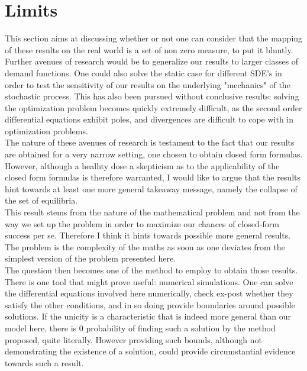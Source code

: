 \section{Limits}\label{limits}

This section aims at discussing whether or not one can consider that the mapping of these results on the real world is a set of non zero measure, to put it bluntly.\\

Further avenues of research would be to generalize our results to larger classes of demand functions. One could also solve the static case for different SDE's in order to test the sensitivity of our results on the underlying "mechanics" of the stochastic process. This has also been pursued without conclusive results: solving the optimization problem becomes quickly extremely difficult, as the second order differential equations exhibit poles, and divergences are difficult to cope with in optimization problems. \\

The nature of these avenues of research is testament to the fact that our results are obtained for a very narrow setting, one chosen to obtain closed form formulas. However, although a healhty dose a skepticism as to the applicability of the closed form formulas is therefore warranted, I would like to argue that the results hint towards at least one more general takeaway message, namely the collapse of the set of equilibria.\\

This result stems from the nature of the mathematical problem and not from the way we set up the problem in order to maximize our chances of closed-form success per se. Therefore I think it hints towards possible more general results. The problem is the complexity of the maths as soon as one deviates from the simplest version of the problem presented here. \\

The question then becomes one of the method to employ to obtain those results. There is one tool that might prove useful: numerical simulations. One can solve the differential equations involved here numerically, check ex-post whether they satisfy the other conditions, and in so doing provide boundaries around possible solutions. If the unicity is a characteristic that is indeed more general than our model here, there is 0 probability of finding such a solution by the method proposed, quite literally. However providing such bounds, although not demonstrating the existence of a solution, could provide circumstantial evidence towards such a result.\\

